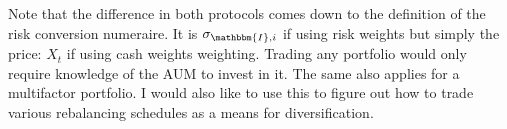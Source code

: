 Note that the difference in both protocols comes down to the definition of the risk conversion numeraire. It is $\sigma_{\mathbbm{I},i}$ if using risk weights but simply the price: $X_t$ if using cash weights weighting. Trading any portfolio would only require knowledge of the AUM to invest in it. The same also applies for a multifactor portfolio. I would also like to use this to figure out how to trade various rebalancing schedules as a means for diversification.
